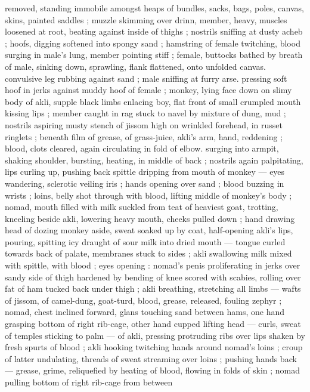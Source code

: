 removed, standing immobile amongst heaps of bundles, sacks, bags,
poles, canvas, skins, painted saddles ; muzzle skimming over drinn,
member, heavy, muscles loosened at root, beating against inside of
thighs ; nostrils sniffing at dusty acheb ; hoofs, digging softened into
spongy sand ; hamstring of female twitching, blood surging in male's
lung, member pointing stiff ; female, buttocks bathed by breath of
male, sinking down, sprawling, flank flattened, onto unfolded canvas.
convulsive leg rubbing against sand ; male sniffing at furry arse.
pressing soft hoof in jerks against muddy hoof of female ; monkey,
lying face down on slimy body of akli, supple black limbs enlacing
boy, flat front of small crumpled mouth kissing lips ; member caught
in rag stuck to navel by mixture of dung, mud ; nostrils aspiring
musty stench of jissom high on wrinkled forehead, in russet ringlets
; beneath film of grease, of grass-juice, akli's arm, hand, reddening
; blood, clots cleared, again circulating in fold of elbow. surging into
armpit, shaking shoulder, bursting, heating, in middle of back ;
nostrils again palpitating, lips curling up, pushing back spittle
dripping from mouth of monkey --- eyes wandering, sclerotic veiling
iris ; hands opening over sand ; blood buzzing in wrists ; loins, belly
shot through with blood, lifting middle of monkey's body ; nomad,
mouth filled with milk suckled from teat of heaviest goat, trotting,
kneeling beside akli, lowering heavy mouth, cheeks pulled down ;
hand drawing head of dozing monkey aside, sweat soaked up by
coat, half-opening akli’s lips, pouring, spitting icy draught of sour
milk into dried mouth --- tongue curled towards back of palate,
membranes stuck to sides ; akli swallowing milk mixed with spittle,
with blood ; eyes opening : nomad’s penis proliferating in jerks over
sandy side of thigh hardened by bending of knee scored with
scabies, rolling over fat of ham tucked back under thigh ; akli
breathing, stretching all limbs --- wafts of jissom, of camel-dung,
goat-turd, blood, grease, released, fouling zephyr ; nomad, chest
inclined forward, glans touching sand between hams, one hand
grasping bottom of right rib-cage, other hand cupped lifting head ---
curls, sweat of temples sticking to palm --- of akli, pressing
protruding ribs over lips shaken by fresh spurts of blood ; akli
hooking twitching hands around nomad’s loins ; croup of latter
undulating, threads of sweat streaming over loins ; pushing hands
back --- grease, grime, reliquefied by heating of blood, flowing in
folds of skin ; nomad pulling bottom of right rib-cage from between
